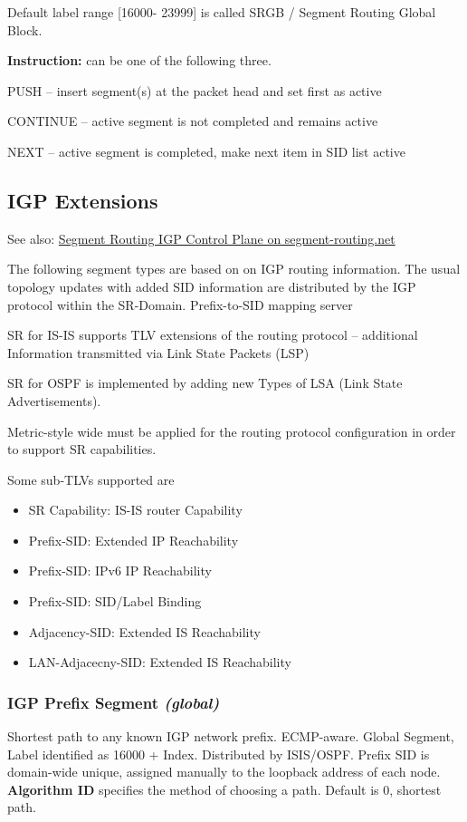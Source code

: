 Default label range [16000- 23999] is called SRGB / Segment Routing Global Block.

\vspace{5mm}
\textbf{Instruction: } can be one of the following three.

\noindent
PUSH -- insert segment(s) at the packet head and set first as active

\noindent
CONTINUE -- active segment is not completed and remains active

\noindent
NEXT -- active segment is completed, make next item in SID list active

\subsection{IGP Extensions}

See also: \href{https://www.segment-routing.net/tutorials/2016-09-27-segment-routing-igp-control-plane/}{Segment Routing IGP Control Plane on segment-routing.net}

\vspace{5mm}
The following segment types are based on on IGP routing information. The usual topology updates with added SID information are distributed by the IGP protocol within the SR-Domain.
Prefix-to-SID mapping server 

SR for IS-IS supports TLV extensions of the routing protocol -- additional Information transmitted via Link State Packets (LSP)

SR for OSPF is implemented by adding new Types of LSA (Link State Advertisements).

Metric-style wide must be applied for the routing protocol configuration in order to support SR capabilities.

\vspace{5mm}
Some sub-TLVs supported are
\begin{itemize}
    \item SR Capability: IS-IS router Capability
    \item Prefix-SID: Extended IP Reachability
    \item Prefix-SID: IPv6 IP Reachability
    \item Prefix-SID: SID/Label Binding
    \item Adjacency-SID: Extended IS Reachability
    \item LAN-Adjacecny-SID: Extended IS Reachability
\end{itemize}


\subsubsection{IGP Prefix Segment \emph{(global)}}
Shortest path to any known IGP network prefix. 
ECMP-aware. 
Global Segment, Label identified as 16000 + Index.
Distributed by ISIS/OSPF.
Prefix SID is domain-wide unique, assigned manually to the loopback address of each node.
\textbf{Algorithm ID} specifies the method of choosing a path. Default is 0, shortest path.


